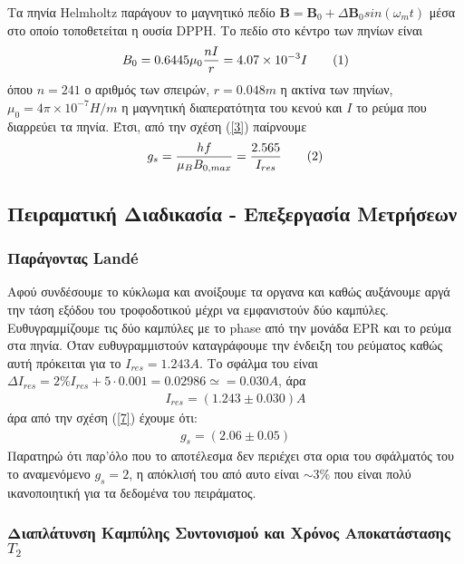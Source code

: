 \documentclass[a4paper]{article}
\newcommand\numberthis{\addtocounter{equation}{1}\tag{\theequation}}
\begin{document}
			Τα πηνία Helmholtz παράγουν το μαγνητικό πεδίο $\textbf{B} = \textbf{B}_0 + \Delta\textbf{B}_0sin(\omega_m t) $ μέσα στο οποίο τοποθετείται η ουσία DPPH. Το πεδίο στο κέντρο των πηνίων είναι 
			\begin{align*}\label{6}
				B_0 = 0.6445\mu_0\frac{nI}{r} = 4.07\times10^{-3}I \numberthis
			\end{align*}
			όπου $n=241$ ο αριθμός των σπειρών, $r=0.048m$ η ακτίνα των πηνίων, $\mu_0 = 4\pi\times10^{-7}H/m$ η μαγνητική διαπερατότητα του κενού και $I$ το ρεύμα που διαρρεύει τα πηνία. Έτσι, από την σχέση (\ref{3}) παίρνουμε 
			\begin{align*}\label{7}
				g_s = \frac{hf}{\mu_BB_{0,max}} = \frac{2.565}{I_{res}}  \numberthis
			\end{align*}
			
	\subsection*{Πειραματική Διαδικασία - Επεξεργασία Μετρήσεων}
	
		\subsubsection*{Παράγοντας Landé}
			Αφού συνδέσουμε το κύκλωμα και ανοίξουμε τα οργανα και καθώς αυξάνουμε αργά την τάση εξόδου του τροφοδοτικού μέχρι να εμφανιστούν δύο καμπύλες. Ευθυγραμμίζουμε τις δύο καμπύλες με το phase από την μονάδα EPR και το ρεύμα στα πηνία. Όταν ευθυγραμμιστούν καταγράφουμε την ένδειξη του ρεύματος καθώς αυτή πρόκειται για το $I_{res} = 1.243A$. Το σφάλμα του είναι $\Delta I_{res} = 2\%I_{res}+ 5\cdot0.001 = 0.02986 \simeq = 0.030A$, άρα 
			\begin{align*}
				I_{res} = ( 1.243 \pm 0.030 ) A
			\end{align*}
	άρα από την σχέση (\ref{7}) έχουμε ότι\footnotemark:
		\begin{align*}
			g_s = ( 2.06 \pm  0.05)	
		\end{align*}				
	Παρατηρώ ότι παρ'όλο που το αποτέλεσμα δεν περιέχει στα ορια του σφάλματός του το αναμενόμενο $g_s=2$, η απόκλισή του από αυτο είναι $\sim 3\%$ που είναι πολύ ικανοποιητική για τα δεδομένα του πειράματος.
	
	\subsubsection*{Διαπλάτυνση Καμπύλης Συντονισμού και Χρόνος Αποκατάστασης $T_2$}
	
\end{document}
